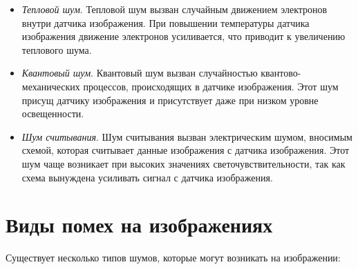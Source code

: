 \begin{itemize}
    \item \textit{Тепловой шум}. Тепловой шум вызван случайным движением электронов внутри датчика изображения. При повышении температуры датчика изображения движение электронов усиливается, что приводит к увеличению теплового шума.
    \item \textit{Квантовый шум}. Квантовый шум вызван случайностью квантово-механических процессов, происходящих в датчике изображения. Этот шум присущ датчику изображения и присутствует даже при низком уровне освещенности.
    \item \textit{Шум считывания}. Шум считывания вызван электрическим шумом, вносимым схемой, которая считывает данные изображения с датчика изображения. Этот шум чаще возникает при высоких значениях светочувствительности, так как схема вынуждена усиливать сигнал с датчика изображения.
\end{itemize}

\section{Виды помех на изображениях}

Существует несколько типов шумов, которые могут возникать на изображении:

